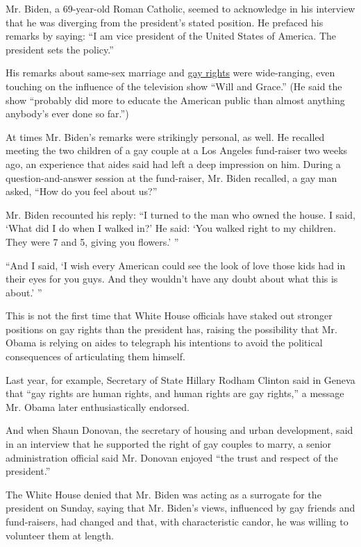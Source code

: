 Mr. Biden, a 69-year-old Roman Catholic, seemed to acknowledge in his
interview that he was diverging from the president's stated position. He
prefaced his remarks by saying: ``I am vice president of the United
States of America. The president sets the policy.''

His remarks about same-sex marriage and
\href{https://www.nytimes.com/2020/06/21/us/politics/biden-gay-rights-lgbt.html}{gay
rights} were wide-ranging, even touching on the influence of the
television show ``Will and Grace.'' (He said the show ``probably did
more to educate the American public than almost anything anybody's ever
done so far.'')

At times Mr. Biden's remarks were strikingly personal, as well. He
recalled meeting the two children of a gay couple at a Los Angeles
fund-raiser two weeks ago, an experience that aides said had left a deep
impression on him. During a question-and-answer session at the
fund-raiser, Mr. Biden recalled, a gay man asked, ``How do you feel
about us?''

Mr. Biden recounted his reply: ``I turned to the man who owned the
house. I said, `What did I do when I walked in?' He said: `You walked
right to my children. They were 7 and 5, giving you flowers.' ''

``And I said, `I wish every American could see the look of love those
kids had in their eyes for you guys. And they wouldn't have any doubt
about what this is about.' ''

This is not the first time that White House officials have staked out
stronger positions on gay rights than the president has, raising the
possibility that Mr. Obama is relying on aides to telegraph his
intentions to avoid the political consequences of articulating them
himself.

Last year, for example, Secretary of State Hillary Rodham Clinton said
in Geneva that ``gay rights are human rights, and human rights are gay
rights,'' a message Mr. Obama later enthusiastically endorsed.

And when Shaun Donovan, the secretary of housing and urban development,
said in an interview that he supported the right of gay couples to
marry, a senior administration official said Mr. Donovan enjoyed ``the
trust and respect of the president.''

The White House denied that Mr. Biden was acting as a surrogate for the
president on Sunday, saying that Mr. Biden's views, influenced by gay
friends and fund-raisers, had changed and that, with characteristic
candor, he was willing to volunteer them at length.

